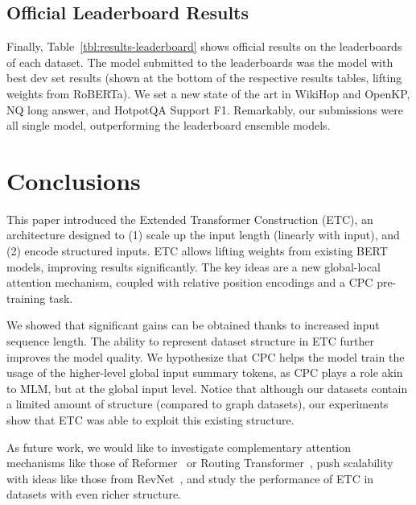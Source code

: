 \documentclass[11pt,a4paper]{article}
\begin{document}
\subsection{Official Leaderboard Results}

Finally, Table~\ref{tbl:results-leaderboard} shows official results on the leaderboards of each dataset. The model submitted to the leaderboards was the model with best dev set results (shown at the bottom of the respective results tables, lifting weights from RoBERTa). We set a new state of the art in WikiHop and OpenKP, NQ long answer, and HotpotQA Support F1. Remarkably, our submissions were all single model, outperforming the leaderboard ensemble models.



\section{Conclusions}\label{sec:conclusions}

This paper introduced the Extended Transformer Construction (ETC), an architecture designed to (1) scale up the input length (linearly with input), and (2) encode structured inputs. ETC allows lifting weights from existing BERT models, improving results significantly. The key ideas are a new global-local attention mechanism, coupled with relative position encodings and a CPC pre-training task.

We showed that significant gains can be obtained thanks to increased input sequence length. The ability to represent dataset structure in ETC further improves the model quality. We hypothesize that CPC helps the model train the usage of the higher-level global input summary tokens, as CPC plays a role akin to MLM, but at the global input level. Notice that although our datasets contain a limited amount of structure (compared to graph datasets), our experiments show that ETC was able to exploit this existing structure.  

As future work, we would like to investigate complementary attention mechanisms like those of Reformer~\cite{kitaev2020reformer} or Routing Transformer~\cite{roy2020efficient}, push scalability with ideas like those from RevNet~\cite{gomez2017reversible}, and study the performance of ETC in datasets with even richer structure. 
\end{document}
